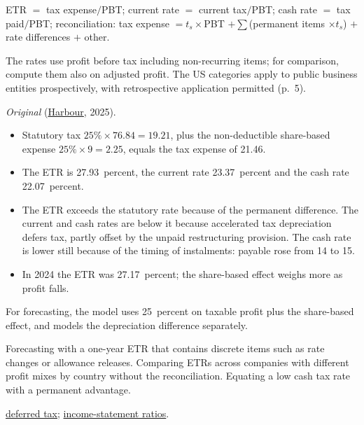 \begin{qfmethod}
 ETR $=$ tax expense$/$PBT; current rate $=$ current tax$/$PBT; cash rate $=$ tax paid$/$PBT; reconciliation: tax expense $=t_s\times$PBT $+\sum$(permanent items $\times t_s$) $+$ rate differences $+$ other.

 The rates use profit before tax including non-recurring items; for comparison, compute them also on adjusted profit. The US categories apply to public business entities prospectively, with retrospective application permitted (p.~5).

 \emph{Original} (\hyperref[ex:harbour-tools-statements]{Harbour}, 2025).
\begin{itemize}
\item Statutory tax $25\%\times76.84=19.21$, plus the non-deductible share-based expense $25\%\times9=2.25$, equals the tax expense of 21.46.
\item The ETR is 27.93~percent, the current rate 23.37~percent and the cash rate 22.07~percent.
\item The ETR exceeds the statutory rate because of the permanent difference. The current and cash rates are below it because accelerated tax depreciation defers tax, partly offset by the unpaid restructuring provision. The cash rate is lower still because of the timing of instalments: payable rose from 14 to 15.
\item In 2024 the ETR was 27.17~percent; the share-based effect weighs more as profit falls.
\end{itemize}
For forecasting, the model uses 25~percent on taxable profit plus the share-based effect, and models the depreciation difference separately.

 Forecasting with a one-year ETR that contains discrete items such as rate changes or allowance releases. Comparing ETRs across companies with different profit mixes by country without the reconciliation. Equating a low cash tax rate with a permanent advantage.

 \hyperref[meth:deferred-tax-analysis]{deferred tax}; \hyperref[meth:income-statement-ratios]{income-statement ratios}.

\end{qfmethod}
